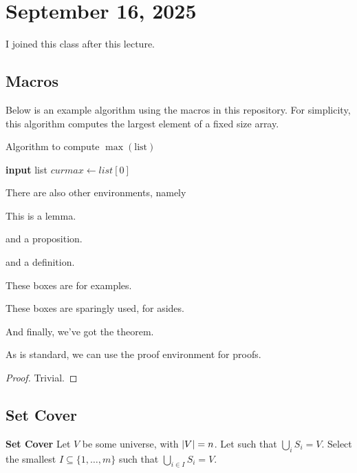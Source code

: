 \section{September 16, 2025}
I joined this class after this lecture. 

\subsection{Macros}
Below is an example algorithm using the macros in this repository. For simplicity, this algorithm computes the largest element of a fixed size array.

\begin{algorithm}[H]
    \caption{Algorithm to compute $\max(\text{list})$}
    \DontPrintSemicolon
    \textbf{input} list\;
    $curmax \leftarrow list[0]$\;
\end{algorithm}

There are also other environments, namely
\begin{lemma}
    This is a lemma.
\end{lemma}
\begin{proposition}
    and a proposition.
\end{proposition}
\begin{definition}
    and a definition.
\end{definition}
\begin{example}
    These boxes are for examples.
\end{example}
\begin{aside}
    These boxes are sparingly used, for asides.
\end{aside}
\begin{theorem}
    And finally, we've got the theorem.
\end{theorem}
As is standard, we can use the proof environment for proofs.
\begin{proof}
    Trivial.
\end{proof}

\subsection{Set Cover}
\begin{definition}
    \textbf{Set Cover} Let $V$ be some universe, with $\abs{V} = n$. Let
    such that $\bigcup_i S_i = V$. Select the smallest $I \subseteq \{ 1, \ldots, m \}$ such that $\bigcup_{i \in I} S_i = V$.
\end{definition}

